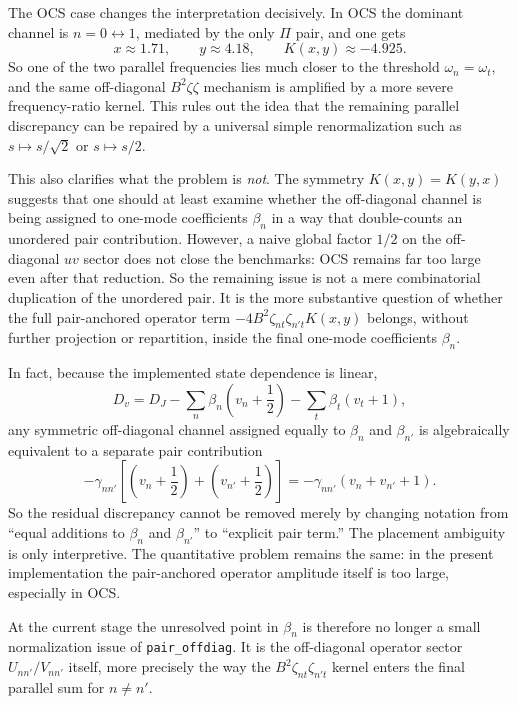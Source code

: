 \documentclass[11pt]{article}
\begin{document}
The OCS case changes the interpretation decisively. In OCS the dominant channel
is $n=0\leftrightarrow 1$, mediated by the only $\Pi$ pair, and one gets
\[
x\approx 1.71,
\qquad
y\approx 4.18,
\qquad
K(x,y)\approx -4.925.
\]
So one of the two parallel frequencies lies much closer to the threshold
$\omega_n=\omega_t$, and the same off-diagonal $B^2\zeta\zeta$ mechanism is
amplified by a more severe frequency-ratio kernel. This rules out the idea
that the remaining parallel discrepancy can be repaired by a universal simple
renormalization such as $s\mapsto s/\sqrt{2}$ or $s\mapsto s/2$.

This also clarifies what the problem is \emph{not}. The symmetry
$K(x,y)=K(y,x)$ suggests that one should at least examine whether the
off-diagonal channel is being assigned to one-mode coefficients $\beta_n$ in a
way that double-counts an unordered pair contribution. However, a naive global
factor $1/2$ on the off-diagonal $uv$ sector does not close the benchmarks:
OCS remains far too large even after that reduction. So the remaining issue is
not a mere combinatorial duplication of the unordered pair. It is the more
substantive question of whether the full pair-anchored operator term
$-4B^2\zeta_{nt}\zeta_{n't}K(x,y)$ belongs, without further projection or
repartition, inside the final one-mode coefficients $\beta_n$.

In fact, because the implemented state dependence is linear,
\[
D_v = D_J - \sum_n \beta_n\left(v_n+\frac{1}{2}\right)-\sum_t\beta_t(v_t+1),
\]
any symmetric off-diagonal channel assigned equally to $\beta_n$ and
$\beta_{n'}$ is algebraically equivalent to a separate pair contribution
\[
-\gamma_{nn'}\left[\left(v_n+\frac{1}{2}\right)+\left(v_{n'}+\frac{1}{2}\right)\right]
=
-\gamma_{nn'}(v_n+v_{n'}+1).
\]
So the residual discrepancy cannot be removed merely by changing notation from
``equal additions to $\beta_n$ and $\beta_{n'}$'' to ``explicit pair term.'' The
placement ambiguity is only interpretive. The quantitative problem remains the
same: in the present implementation the pair-anchored operator amplitude itself
is too large, especially in OCS.

At the current stage the unresolved point in $\beta_n$ is therefore no longer a
small normalization issue of \texttt{pair\_offdiag}. It is the off-diagonal
operator sector $U_{nn'}/V_{nn'}$ itself, more precisely the way the
$B^2\zeta_{nt}\zeta_{n't}$ kernel enters the final parallel sum for $n\neq n'$.
\end{document}
